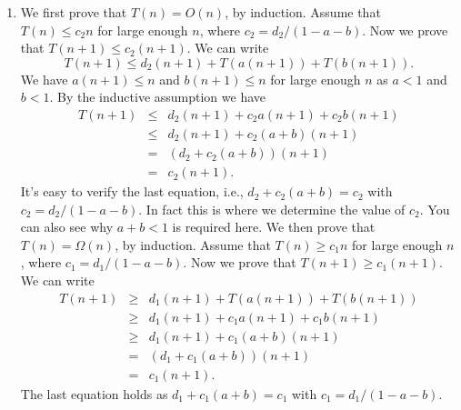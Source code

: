 \documentclass[11pt]{article}
\begin{document}
\begin{qunlist}
\begin{enumerate}
\item
We first prove that $T(n) = O(n)$, by induction.
Assume that $T(n) \le c_2n$ for large enough $n$, where $c_2 = d_2/(1-a-b)$.
Now we prove that $T(n + 1) \le c_2(n+1)$.
We can write
$$T(n + 1) \le d_2(n+1) + T(a(n+1)) + T(b(n+1)).$$
We have $a(n+1) \le n$ and $b(n+1) \le n$ for large enough $n$ as $a < 1$ and $b < 1$.
By the inductive assumption we have
\begin{eqnarray*}
T(n + 1) & \le & d_2(n+1) + c_2a(n+1) + c_2b(n+1) \\
	      & \le & d_2(n+1) + c_2(a+b)(n+1) \\
	      & =   & (d_2 + c_2(a+b))(n+1) \\
		  & =   & c_2(n+1).
\end{eqnarray*}
It's easy to verify the last equation, i.e., $d_2 + c_2(a+b) = c_2$ with $c_2 = d_2 / (1 - a - b)$.
In fact this is where we determine the value of $c_2$. You can also see why
$a + b < 1$ is required here.
We then prove that $T(n) = \Omega(n)$, by induction.
Assume that $T(n) \ge c_1n$ for large enough $n$, where $c_1 = d_1/(1-a-b)$.
Now we prove that $T(n + 1) \ge c_1(n+1)$.
We can write
\begin{eqnarray*}
T(n + 1) &\ge & d_1(n+1) + T(a(n+1)) + T(b(n+1)) \\
          & \ge & d_1(n+1) + c_1a(n+1) + c_1b(n+1) \\
	      & \ge & d_1(n+1) + c_1(a+b)(n+1) \\
	      & =   & (d_1 + c_1(a+b))(n+1) \\
		  & =   & c_1(n+1).
\end{eqnarray*}
The last equation holds as $d_1 + c_1(a+b) = c_1$ with $c_1 = d_1 / (1 - a - b)$.


\end{enumerate}
\end{qunlist}
\end{document}
